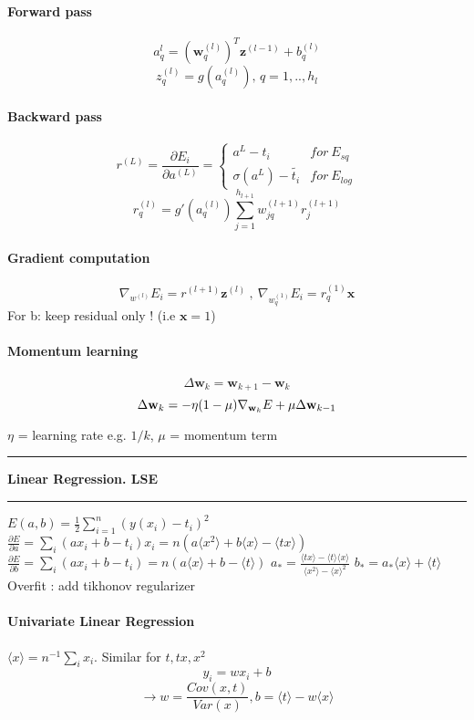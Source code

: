 \documentclass[7pt]{scrartcl}
\newlength{\secskip}
\renewcommand{\section}[1]{
  \hrule\vspace{.1em}
  \textbf{#1}
  \hrule
}
\renewcommand{\vec}{\mathbf}
\begin{document}
\begin{multicols}{4}
\paragraph{Forward pass}
\[a_q^{l} = (\vec w_q^{(l)})^T\vec z^{(l-1)}+b_q^{(l)}\]
\[z_q^{(l)}=g(a_q^{(l)})\text{, }q=1,..,h_l\]

\paragraph{Backward pass}
\[r^{(L)}=\frac{\partial E_i}{\partial a^{(L)}} = \left\{ \begin{array}{ll}a^L - t_i & for~ E_{sq}  \\ \sigma(a^L) - \tilde{t_i} & for~ E_{log} \end{array} \right. \]
\[r_q^{(l)}=g'(a_q^{(l)})\sum_{j=1}^{h_{l+1}}w_{jq}^{(l+1)}r_j^{(l+1)}\]

\paragraph{Gradient computation}
\[\nabla_{w^{(l)}} E_i = r^{(l+1)} \vec{z}^{(l)} ~,~\nabla_{w_q^{(1)}} E_i = r_q^{(1)} \vec{x}\]
For b: keep residual only ! (i.e $\vec x = 1$)

\paragraph{Momentum learning}
\[\Delta \vec w_k = \vec w_{k+1}-\vec w_k\]
\[\Delta \vec w_k = -\eta(1-\mu)\nabla_{\textbf w_k}E+\mu \Delta \vec w_{k-1}\]

$\eta$ = learning rate e.g. $1/k$, $\mu$ = momentum term

\section{Linear Regression. LSE}
$E(a,b)=\frac{1}{2} \sum_{i=1}^n (y(x_i)-t_i)^2$
$\frac{\partial E}{\partial a} = \sum_i (ax_i+b-t_i)x_i=n(a\langle x^2 \rangle + b \langle x \rangle - \langle tx \rangle )$
$\frac{\partial E}{\partial b} = \sum_i (ax_i+b-t_i)=n(a\langle x \rangle + b - \langle t \rangle )$
$a_*=\frac{\langle tx \rangle - \langle t \rangle \langle x \rangle}{\langle x^2 \rangle - \langle x \rangle ^2}$
$b_*=a_* \langle x \rangle + \langle t \rangle$
Overfit : add tikhonov regularizer
\paragraph{Univariate Linear Regression}
$\langle x \rangle = n^{-1} \sum_i x_i $. Similar for $t, tx, x^2$
\[y_i = wx_i + b \]
\[\rightarrow w=\frac{Cov(x,t)}{Var(x)}, b=\langle t \rangle - w \langle x \rangle \]


\end{multicols}
\end{document}
